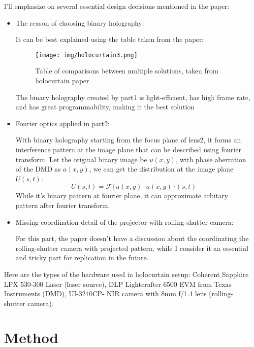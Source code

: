 \documentclass[10pt,journal,compsoc]{IEEEtran}
\begin{document}
I'll emphasize on several essential design decisions mentioned in the paper:
\begin{itemize}
    \item The reason of choosing binary holography:
    
    It can be best explained using the table taken from the paper:
    
    \begin{figure}[!h]
        \centering
        \texttt{[image: img/holocurtain3.png]}
        \caption{Table of comparisons between multiple solutions, taken from holocurtain paper\cite{holocurtain}}
        \label{fig:fig5}
    \end{figure}

    The binary holography created by part1 is light-efficient, has high frame rate, and has great programmability, making it the best solution
    \item Fourier optics applied in part2:
    
    With binary holography starting from the focus plane of lens2, it forms an interference pattern at the image plane that can be described using fourier transform. Let the original binary image be $u(x, y)$, with phase aberration of the DMD as $a(x, y)$, we can get the distribution at the image plane $U(s, t)$:
    \begin{equation}
        U(s, t) = \mathcal{F}\{u(x, y) \cdot a(x, y)\}(s, t)
    \end{equation}
    While it's binary pattern at fourier plane, it can approximate arbitary pattern after fourier transform.
    \item Missing coordination detail of the projector with rolling-shutter camera:
    
    For this part, the paper doesn't have a discussion about the coordinating the rolling-shutter camera with projected pattern, while I consider it an essential and tricky part for replication in the future.
\end{itemize}

Here are the types of the hardware used in holocurtain setup:
Coherent Sapphire LPX 530-300 Laser (laser source), DLP Lightcrafter 6500 EVM from Texas Instruments (DMD), UI-3240CP- NIR camera with 8mm f/1.4 lens (rolling-shutter camera).

\section{Method}
\label{sec:Method}
\end{document}
